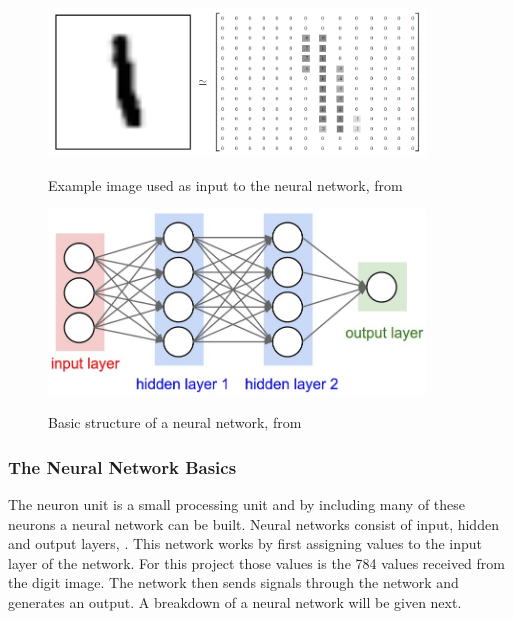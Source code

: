 \begin{figure}
  \centering
  \includegraphics[width=10cm]{MNIST}\\
  \caption{Example image used as input to the neural network, from \citet{tensor2017}}
  \label{fig:mnist}
\end{figure}

\begin{figure}
  \centering
  \includegraphics[width=10cm]{NN}\\
  \caption{Basic structure of a neural network, from \citet{karpathy2017}}%
  \label{fig:nn}
\end{figure}

\subsubsection{The Neural Network Basics}

The neuron unit is a small processing unit and by including many of these neurons a neural network can be built. Neural networks consist of input, hidden and output layers, \citet{MichealN2015}. This network works by first assigning values to the input layer of the network. For this project those values is the 784 values received from the digit image. The network then sends signals through the network and generates an output. A breakdown of a neural network will be given next.

